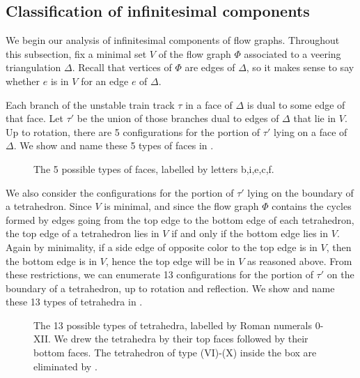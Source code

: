 \documentclass[12pt]{amsart}
\theoremstyle{definition}
\numberwithin{equation}{section}
\begin{document}
\subsection{Classification of infinitesimal components} \label{subsec:infcompproof}

We begin our analysis of infinitesimal components of flow graphs. Throughout this subsection, fix a minimal set $V$ of the flow graph $\Phi$ associated to a veering triangulation $\Delta$. Recall that vertices of $\Phi$ are edges of $\Delta$, so it makes sense to say whether $e$ is in $V$ for an edge $e$ of $\Delta$.

Each branch of the unstable train track $\tau$ in a face of $\Delta$ is dual to some edge of that face. Let $\tau'$ be the union of those branches dual to edges of $\Delta$ that lie in $V$. Up to rotation, there are 5 configurations for the portion of $\tau'$ lying on a face of $\Delta$. We show and name these 5 types of faces in .

\begin{figure}
    \centering
        \fontsize{14pt}{14pt}\selectfont
    \resizebox{!}{8cm}{}
    \caption{The 5 possible types of faces, labelled by letters b,i,e,c,f.}
    \label{fig:facetype}
\end{figure}

We also consider the configurations for the portion of $\tau'$ lying on the boundary of a tetrahedron. Since $V$ is minimal, and since the flow graph $\Phi$ contains the cycles formed by edges going from the top edge to the bottom edge of each tetrahedron, the top edge of a tetrahedron lies in $V$ if and only if the bottom edge lies in $V$. Again by minimality, if a side edge of opposite color to the top edge is in $V$, then the bottom edge is in $V$, hence the top edge will be in $V$ as reasoned above. From these restrictions, we can enumerate 13 configurations for the portion of $\tau'$ on the boundary of a tetrahedron, up to rotation and reflection. We show and name these 13 types of tetrahedra in .

\begin{figure}
    \centering
        \fontsize{14pt}{14pt}\selectfont
    \resizebox{!}{18cm}{}
    \caption{The 13 possible types of tetrahedra, labelled by Roman numerals 0-XII. We drew the tetrahedra by their top faces followed by their bottom faces. The tetrahedron of type (VI)-(X) inside the box are eliminated by .}
    \label{fig:tettype}
\end{figure}
\end{document}
